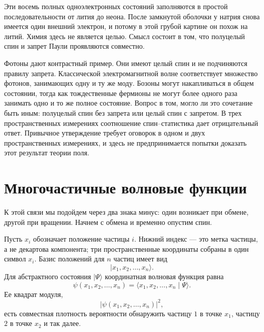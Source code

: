Эти восемь полных одноэлектронных состояний заполняются в простой последовательности от лития до неона. После замкнутой оболочки у натрия снова имеется один внешний электрон, и потому в этой грубой картине он похож на литий. Химия здесь не является целью. Смысл состоит в том, что полуцелый спин и запрет Паули проявляются совместно.

Фотоны дают контрастный пример. Они имеют целый спин и не подчиняются правилу запрета. Классической электромагнитной волне соответствует множество фотонов, занимающих одну и ту же моду. Бозоны могут накапливаться в общем состоянии, тогда как тождественные фермионы не могут более одного раза занимать одно и то же полное состояние. Вопрос в том, могло ли это сочетание быть иным: полуцелый спин без запрета или целый спин с запретом. В трех пространственных измерениях соотношение спин--статистика дает отрицательный ответ. Привычное утверждение требует оговорок в одном и двух пространственных измерениях, и здесь не предпринимается попытки доказать этот результат теории поля.

\begin{classroomqa}
\end{classroomqa}

\section{Многочастичные волновые функции}

К этой связи мы подойдем через два знака минус: один возникает при обмене, другой при вращении. Начнем с обмена и временно опустим спин.

Пусть \(x_i\) обозначает положение частицы \(i\). Нижний индекс — это метка частицы, а не декартова компонента; три пространственные координаты собраны в один символ \(x_i\). Базис положений для \(n\) частиц имеет вид
\begin{equation}
\lvert x_1,x_2,\ldots,x_n\rangle.
\end{equation}
Для абстрактного состояния \(\lvert\Psi\rangle\) координатная волновая функция равна
\begin{equation}
\psi(x_1,x_2,\ldots,x_n)
=
\langle x_1,x_2,\ldots,x_n\mid\Psi\rangle.
\end{equation}
Ее квадрат модуля,
\begin{equation}
\bigl\lvert\psi(x_1,x_2,\ldots,x_n)\bigr\rvert^2,
\end{equation}
есть совместная плотность вероятности обнаружить частицу \(1\) в точке \(x_1\), частицу \(2\) в точке \(x_2\) и так далее.

